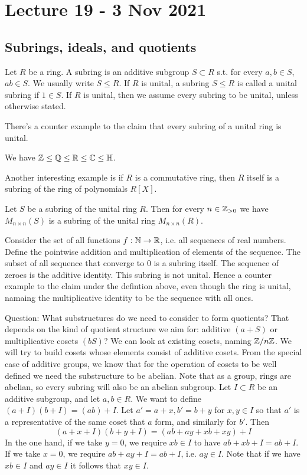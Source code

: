\section{Lecture 19 - 3 Nov 2021}
\subsection{Subrings, ideals, and quotients}
\begin{definition}
  Let $R$ be a ring. A subring is an additive subgroup $S\subset R$ s.t. for every
  $a,b\in S$, $ab\in S$. We usually write $S\leq R$. If $R$ is unital, a subring $S\leq R$
  is called a unital subring if $1\in S$. If $R$ is unital, then we assume every subring
  to be unital, unless otherwise stated.
  \label{<+label+>}
\end{definition}
There's a counter example to the claim that every subring of a unital ring is unital. 

\begin{example}
  We have $\mathbb Z \leq \mathbb Q \leq \mathbb R \leq \mathbb C \leq \mathbb H$.

  Another interesting example is if $R$ is a commutative ring, then $R$ itself is a
  subring of the ring of polynomials $R[X]$.

  Let $S$ be a subring of the unital ring $R$. Then for every $n\in\mathbb Z_{>0}$ we have
  $M_{n\times n}(S)$ is a subring of the unital ring $M_{n\times n}(R)$.

  Consider the set of all functions $f:\mathbb N\to\mathbb R$, i.e. all sequences of real numbers.
  Define the pointwise addition and multiplication of elements of the sequence. The subset
  of all sequence that converge to $0$ is a subring itself. The sequence of zeroes is the
  additive identity. This subring is not unital. Hence a counter example to the claim
  under the defintion above, even though the ring is unital, namaing the multiplicative
  identity to be the sequence with all ones. 
\end{example}


Question: What substructures do we need to consider to form quotients?
That depends on the kind of quotient structure we aim for: additive $(a+S)$ or
multiplicative cosets $(bS)$? We can look at existing cosets, naming $\mathbb Z/n\mathbb Z$. We will
try to build cosets whose elements consist of additive cosets. From the special case of
additive groups, we know that for the operation of cosets to be well defined we need the
substructure to be abelian. Note that as a group, rings are abelian, so every subring will
also be an abelian subgroup. Let $I\subset R$ be an additive subgroup, and let $a,b\in R$.
We want to define $(a+I)(b+I)=(ab)+I$. Let $a'=a+x, b'=b+y$ for $x,y\in I$ so that $a'$ is
a representative of the same coset that $a$ form, and similarly for $b'$. Then
\[(a+x+I)(b+y+I)= (ab+ay+xb+xy) + I\]
In the one hand, if we take $y=0$, we require $xb\in I$ to have $ab+xb+I=ab+I$. If we take
$x=0$, we require $ab+ay+I=ab+I$, i.e. $ay\in I$. Note that if we have $xb\in I$ and
$ay\in I$ it follows that $xy\in I$.

